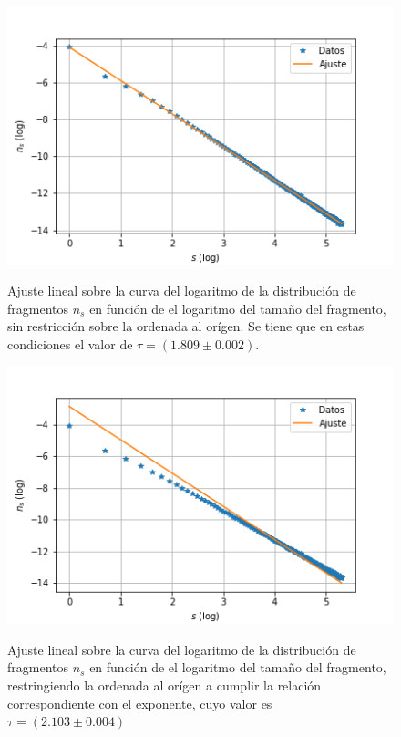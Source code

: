 \documentclass[
 reprint,
 amsmath,amssymb,
 aps,
]{revtex4-1}
\begin{document}
\begin{figure}[ht]
\begin{center}
\includegraphics[scale=0.62]{../images/n_s_vs_s_ajuste.png} \\
\caption{Ajuste lineal sobre la curva del logaritmo de la distribuci\'on de fragmentos $n_s$ en funci\'on de el logaritmo del tama\~no del fragmento, sin restricci\'on sobre la ordenada al or\'igen. Se tiene que en estas condiciones el valor de $\tau = (1.809 \pm 0.002)$.}\label{n_s_vs_s_ajuste}
\end{center}
\end{figure}

\begin{figure}[ht]
\begin{center}
\includegraphics[scale=0.62]{../images/n_s_vs_s_ajuste_mejor.png} \\
\caption{Ajuste lineal sobre la curva del logaritmo de la distribuci\'on de fragmentos $n_s$ en funci\'on de el logaritmo del tama\~no del fragmento, restringiendo la ordenada al or\'igen a cumplir la relaci\'on correspondiente con el exponente, cuyo valor es $\tau = (2.103 \pm 0.004)$}\label{n_s_vs_s_ajuste_mejor}
\end{center}
\end{figure}
\end{document}
